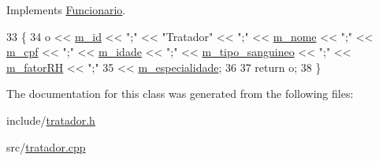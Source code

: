 Implements \hyperlink{classFuncionario_a06bb354ea21c7059a9740a6402f26b5c}{Funcionario}.


\begin{DoxyCode}
33 \{
34     o << \hyperlink{classFuncionario_a123c4af00e4e6eea5d4d9366a8bfefed}{m\_id} << \textcolor{stringliteral}{";"} << \textcolor{stringliteral}{"Tratador"} << \textcolor{stringliteral}{";"} << \hyperlink{classFuncionario_a09663cf1395c066ef8cd538ead0f1a10}{m\_nome} << \textcolor{stringliteral}{";"} << \hyperlink{classFuncionario_af367fc8ad2efde9527d1ed0455560690}{m\_cpf} << \textcolor{stringliteral}{";"} << 
      \hyperlink{classFuncionario_a2bc5a68aebcf1a792812430ce5c8bdca}{m\_idade} << \textcolor{stringliteral}{";"} << \hyperlink{classFuncionario_a89037092e620b92e1e8e305de50cb2d9}{m\_tipo\_sanguineo} << \textcolor{stringliteral}{";"} << \hyperlink{classFuncionario_ae9e77a47e6604c3d981de2e868619b6d}{m\_fatorRH} << \textcolor{stringliteral}{";"}
35      << \hyperlink{classFuncionario_a501682f1767cc891f9908ebc42e9e186}{m\_especialidade};
36 
37      \textcolor{keywordflow}{return} o;
38 \}
\end{DoxyCode}


The documentation for this class was generated from the following files\+:\begin{DoxyCompactItemize}
\item 
include/\hyperlink{tratador_8h}{tratador.\+h}\item 
src/\hyperlink{tratador_8cpp}{tratador.\+cpp}\end{DoxyCompactItemize}
